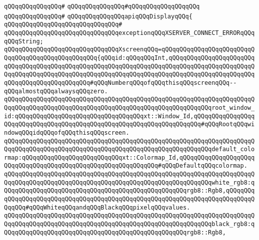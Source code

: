 \verb|qQQqqQQqqQQqqQQq#|\newline
\verb|qQQqqQQqqQQqqQQq#qQQqqQQqqQQqqQQqqQQq|\newline
\verb|qQQqqQQqqQQqqQQq#|\newline
\verb|qQQqqQQqqQQqqQQqapiqQQqDisplayqQQq{|\newline
\verb|qQQqqQQqqQQqqQQqqQQqqQQqqQQqqQQq#|\newline
\verb|qQQqqQQqqQQqqQQqqQQqqQQqqQQqqQQqexceptionqQQqXSERVER_CONNECT_ERRORqQQqqQQqString;|\newline
\newline
\verb|qQQqqQQqqQQqqQQqqQQqqQQqqQQqqQQqXscreenqQQq=qQQqqQQqqQQqqQQqqQQqqQQqqQQqqQQqqQQqqQQqqQQqqQQqqQQq{qQQqid:qQQqqQQqInt,qQQqqQQqqQQqqQQqqQQqqQQqqQQqqQQqqQQqqQQqqQQqqQQqqQQqqQQqqQQqqQQqqQQqqQQqqQQqqQQqqQQqqQQqqQQqqQQqqQQqqQQqqQQqqQQqqQQqqQQqqQQqqQQqqQQqqQQqqQQqqQQqqQQqqQQqqQQqqQQqqQQqqQQqqQQqqQQqqQQqqQQqqQQq#qQQqNumberqQQqofqQQqthisqQQqscreenqQQq--qQQqalmostqQQqalwaysqQQqzero.|\newline
\newline
\verb|qQQqqQQqqQQqqQQqqQQqqQQqqQQqqQQqqQQqqQQqqQQqqQQqqQQqqQQqqQQqqQQqqQQqqQQqqQQqqQQqqQQqqQQqqQQqqQQqqQQqqQQqqQQqqQQqqQQqqQQqqQQqqQQqroot_window_id:qQQqqQQqqQQqqQQqqQQqqQQqqQQqqQQqqQQqxt::Window_Id,qQQqqQQqqQQqqQQqqQQqqQQqqQQqqQQqqQQqqQQqqQQqqQQqqQQqqQQqqQQqqQQqqQQqqQQq#qQQqRootqQQqwindowqQQqidqQQqofqQQqthisqQQqscreen.|\newline
\verb|qQQqqQQqqQQqqQQqqQQqqQQqqQQqqQQqqQQqqQQqqQQqqQQqqQQqqQQqqQQqqQQqqQQqqQQqqQQqqQQqqQQqqQQqqQQqqQQqqQQqqQQqqQQqqQQqqQQqqQQqqQQqqQQqdefault_colormap:qQQqqQQqqQQqqQQqqQQqqQQqqQQqxt::Colormap_Id,qQQqqQQqqQQqqQQqqQQqqQQqqQQqqQQqqQQqqQQqqQQqqQQqqQQqqQQqqQQqqQQq#qQQqDefaultqQQqcolormap.|\newline
\newline
\verb|qQQqqQQqqQQqqQQqqQQqqQQqqQQqqQQqqQQqqQQqqQQqqQQqqQQqqQQqqQQqqQQqqQQqqQQqqQQqqQQqqQQqqQQqqQQqqQQqqQQqqQQqqQQqqQQqqQQqqQQqqQQqqQQqwhite_rgb8:qQQqqQQqqQQqqQQqqQQqqQQqqQQqqQQqqQQqqQQqqQQqqQQqqQQqrgb8::Rgb8,qQQqqQQqqQQqqQQqqQQqqQQqqQQqqQQqqQQqqQQqqQQqqQQqqQQqqQQqqQQqqQQqqQQqqQQqqQQqqQQqqQQq#qQQqWhiteqQQqandqQQqBlackqQQqpixelqQQqvalues.|\newline
\verb|qQQqqQQqqQQqqQQqqQQqqQQqqQQqqQQqqQQqqQQqqQQqqQQqqQQqqQQqqQQqqQQqqQQqqQQqqQQqqQQqqQQqqQQqqQQqqQQqqQQqqQQqqQQqqQQqqQQqqQQqqQQqqQQqblack_rgb8:qQQqqQQqqQQqqQQqqQQqqQQqqQQqqQQqqQQqqQQqqQQqqQQqqQQqrgb8::Rgb8,|\newline
\newline

